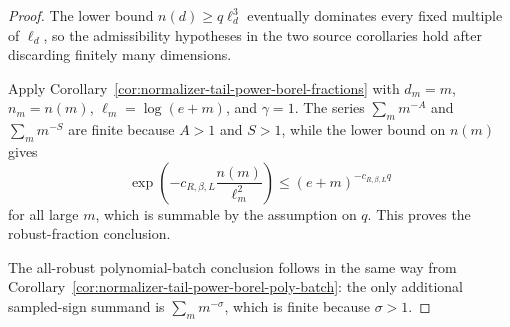 \documentclass[11pt]{amsart}
\numberwithin{equation}{section}
\theoremstyle{definition}
\theoremstyle{remark}
\begin{document}
\begin{proof}
The lower bound \(n(d)\ge q\ell_d^3\) eventually dominates every fixed multiple
of \(\ell_d\), so the admissibility hypotheses in the two source corollaries
hold after discarding finitely many dimensions.

Apply Corollary~\ref{cor:normalizer-tail-power-borel-fractions} with
\(d_m=m\), \(n_m=n(m)\), \(\ell_m=\log(e+m)\), and \(\gamma=1\).  The series
\(\sum_m m^{-A}\) and \(\sum_m m^{-S}\) are finite because \(A>1\) and \(S>1\),
while the lower bound on \(n(m)\) gives
\[
  \exp\left(-c_{R,\beta,L}\frac{n(m)}{\ell_m^2}\right)
  \le (e+m)^{-c_{R,\beta,L}q}
\]
for all large \(m\), which is summable by the assumption on \(q\).  This proves
the robust-fraction conclusion.

The all-robust polynomial-batch conclusion follows in the same way from
Corollary~\ref{cor:normalizer-tail-power-borel-poly-batch}: the only additional
sampled-sign summand is \(\sum_m m^{-\sigma}\), which is finite because
\(\sigma>1\).
\end{proof}
\end{document}
